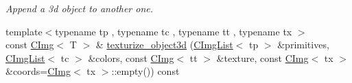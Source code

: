 \begin{DoxyCompactItemize}
\begin{DoxyCompactList}\small\item\em Append a 3d object to another one. \item\end{DoxyCompactList}\item 
\hypertarget{structcimg__library_1_1CImg_a6d4c62c497b8e8fe0071437693c589e9}{
{\footnotesize template$<$typename tp , typename tc , typename tt , typename tx $>$ }\\const \hyperlink{structcimg__library_1_1CImg}{CImg}$<$ T $>$ \& \hyperlink{structcimg__library_1_1CImg_a6d4c62c497b8e8fe0071437693c589e9}{texturize\_\-object3d} (\hyperlink{structcimg__library_1_1CImgList}{CImgList}$<$ tp $>$ \&primitives, \hyperlink{structcimg__library_1_1CImgList}{CImgList}$<$ tc $>$ \&colors, const \hyperlink{structcimg__library_1_1CImg}{CImg}$<$ tt $>$ \&texture, const \hyperlink{structcimg__library_1_1CImg}{CImg}$<$ tx $>$ \&coords=\hyperlink{structcimg__library_1_1CImg}{CImg}$<$ tx $>$::empty()) const }
\label{structcimg__library_1_1CImg_a6d4c62c497b8e8fe0071437693c589e9}


\end{DoxyCompactItemize}
